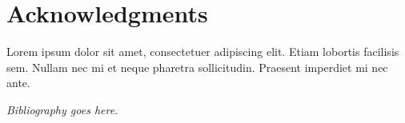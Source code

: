 \documentclass[lettersize,journal]{IEEEtran}
\newcommand*{\shortblindtext}{Lorem ipsum dolor sit amet, consectetuer adipiscing elit. Etiam lobortis facilisis sem. Nullam nec mi et neque pharetra sollicitudin. Praesent imperdiet mi nec ante.}
\begin{document}
\section*{Acknowledgments}
\shortblindtext







\begin{thebibliography}{1}


{\it{Bibliography goes here}}.

\end{thebibliography}



 







\vfill
\end{document}
